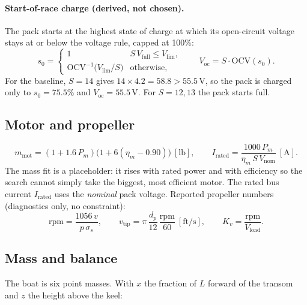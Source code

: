 \documentclass[11pt,a4paper]{article}
\renewcommand{\_}{\textunderscore\allowbreak}
\newcommand{\Voc}{V_{\mathrm{oc}}}
\newcommand{\Vload}{V_{\mathrm{load}}}
\begin{document}
\paragraph{Start-of-race charge (derived, not chosen).}
The pack starts at the highest state of charge at which its open-circuit voltage stays at or below the voltage rule, capped at 100\%:
\begin{equation}
  s_0 =
  \begin{cases}
    1 & S\,V_{\mathrm{full}} \le V_{\lim},\\[2pt]
    \mathrm{OCV}^{-1}\!\bigl(V_{\lim}/S\bigr) & \text{otherwise},
  \end{cases}
  \qquad
  \Voc = S\cdot\mathrm{OCV}(s_0).
  \label{eq:soc0}
\end{equation}
For the baseline, $S=14$ gives $14\times4.2=58.8>55.5\,\mathrm V$, so the pack is charged only to $s_0=75.5\%$ and $\Voc=55.5\,\mathrm V$.
For $S=12,13$ the pack starts full.

\subsection{Motor and propeller}
\begin{equation}
  m_{\mathrm{mot}} = (1 + 1.6\,P_m)\bigl(1 + 6(\eta_m - 0.90)\bigr)\ [\mathrm{lb}], \qquad
  I_{\mathrm{rated}} = \frac{1000\,P_m}{\eta_m\,S\,V_{\mathrm{nom}}}\ [\mathrm A].
  \label{eq:motor}
\end{equation}
The mass fit is a placeholder: it rises with rated power and with efficiency so the search cannot simply take the biggest,
most efficient motor. The rated bus current $I_{\mathrm{rated}}$ uses the \emph{nominal} pack voltage.
Reported propeller numbers (diagnostics only, no constraint):
\begin{equation}
  \mathrm{rpm} = \frac{1056\,v}{p\,\sigma_s}, \qquad
  v_{\mathrm{tip}} = \pi\,\frac{d_p}{12}\,\frac{\mathrm{rpm}}{60}\ [\mathrm{ft/s}], \qquad
  K_v = \frac{\mathrm{rpm}}{\Vload}.
  \label{eq:prop}
\end{equation}

\subsection{Mass and balance}
The boat is six point masses. With $x$ the fraction of $L$ forward of the transom and $z$ the height above the keel:
\end{document}
